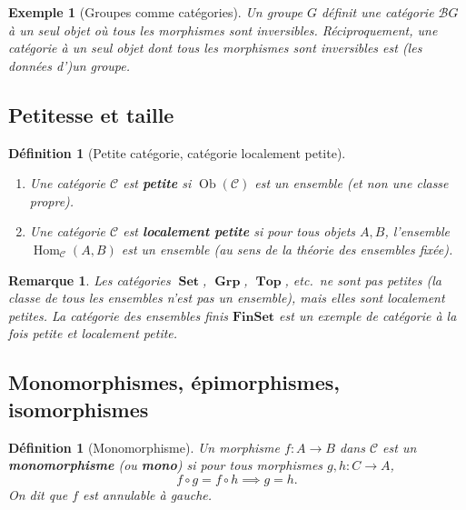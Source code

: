 \documentclass[a4paper,12pt]{book}
\DeclareMathOperator{\Hom}{Hom}
\DeclareMathOperator{\Ob}{Ob}
\DeclareMathOperator{\Set}{\mathbf{Set}}
\DeclareMathOperator{\Grp}{\mathbf{Grp}}
\DeclareMathOperator{\Top}{\mathbf{Top}}
\newtheorem{definition}[theoreme]{Définition}
\newtheorem{exemple}[theoreme]{Exemple}
\newtheorem*{remarque}{Remarque}
\begin{document}
\begin{exemple}[Groupes comme catégories]\label{ex:groupe-categorie}
Un groupe $G$ définit une catégorie $\mathcal{B}G$ à un seul objet où \emph{tous} les morphismes sont inversibles. Réciproquement, une catégorie à un seul objet dont tous les morphismes sont inversibles est (les données d')un groupe.
\end{exemple}

\subsection{Petitesse et taille}

\begin{definition}[Petite catégorie, catégorie localement petite]\label{def:petite-categorie}
\begin{enumerate}[label=(\roman*)]
  \item Une catégorie $\mathcal{C}$ est \textbf{petite} si $\Ob(\mathcal{C})$ est un ensemble (et non une classe propre).
  \item Une catégorie $\mathcal{C}$ est \textbf{localement petite} si pour tous objets $A, B$, l'ensemble $\Hom_{\mathcal{C}}(A,B)$ est un ensemble (au sens de la théorie des ensembles fixée).
\end{enumerate}
\end{definition}

\begin{remarque}
Les catégories $\Set$, $\Grp$, $\Top$, etc.\ ne sont pas petites (la classe de tous les ensembles n'est pas un ensemble), mais elles sont localement petites. La catégorie des ensembles finis $\mathbf{FinSet}$ est un exemple de catégorie à la fois petite et localement petite.
\end{remarque}

\subsection{Monomorphismes, épimorphismes, isomorphismes}

\begin{definition}[Monomorphisme]\label{def:mono}
Un morphisme $f : A \to B$ dans $\mathcal{C}$ est un \textbf{monomorphisme} (ou \textbf{mono}) si pour tous morphismes $g, h : C \to A$,
\[
  f \circ g = f \circ h \implies g = h.
\]
On dit que $f$ est \emph{annulable à gauche}.
\end{definition}
\end{document}
